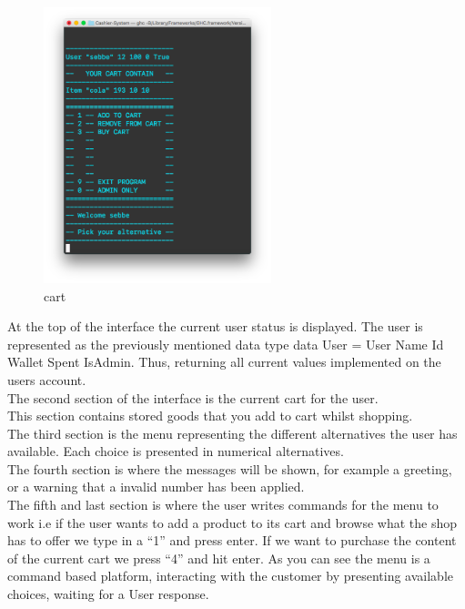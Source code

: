 \documentclass[11pt]{article}
\begin{document}
\begin{figure}[h]
  \includegraphics[width= 250px]{interface2.png}
  \caption{cart}
\end{figure}
\newpage
At the top of the interface the current user status is displayed. The user is represented as the previously mentioned data type data User = User Name Id Wallet Spent IsAdmin.
Thus, returning all current values implemented on the users account.\\
The second section of the interface is the current cart for the user.\\
This section contains stored goods that you add to cart whilst shopping.\\
The third section is the menu representing the different alternatives the user has available. Each choice is presented in numerical alternatives.\\
The fourth section is where the messages will be shown, for example a greeting, or a warning that a invalid number has been applied.\\
The fifth and last section is where the user writes commands for the menu to work i.e if the user wants to add a product to its cart and browse what the shop has to offer we type in a “1” and press enter. If we want to purchase the content of the current cart we press “4” and hit enter. As you can see the menu is a command based platform, interacting with the customer by presenting available choices, waiting for a User response.\\\\
\end{document}
